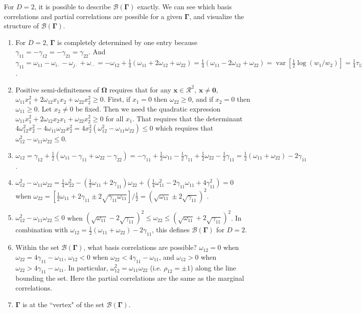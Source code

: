 \documentclass[12pt, letterpaper]{article}
\DeclareMathOperator{\var}{\text{var}}
\begin{document}
For $D = 2$, it is possible to describe $\mathscr{B}(\bm{\Gamma})$ exactly. We can see which basis correlations and partial correlations are possible for a given $\bm{\Gamma}$, and visualize the structure of $\mathscr{B}(\bm{\Gamma})$.
\begin{enumerate}
\item For $D = 2$, $\bm{\Gamma}$ is completely determined by one entry because $\gamma_{11} = -\gamma_{12} = -\gamma_{21} = \gamma_{22}$. And $\gamma_{11} = \omega_{11} - \omega_{i\cdot} - \omega_{j\cdot} + \omega_{\cdot\cdot} = -\omega_{12} + \frac{1}{4}(\omega_{11} + 2\omega_{12} + \omega_{22}) = \frac{1}{4}(\omega_{11} - 2\omega_{12} + \omega_{22}) = \var[\frac{1}{2} \log(w_1/w_2)] = \frac{1}{4} \tau_{12}$.
\item Positive semi-definiteness of $\bm{\Omega}$ requires that for any $\bm{x} \in \mathscr{R}^2,\ \bm{x} \ne \bm{0}$, $\omega_{11} x_1^2 + 2\omega_{12} x_1 x_2 + \omega_{22} x_2^2 \geq 0$. First, if $x_1 = 0$ then $\omega_{22} \geq 0$, and if $x_2 = 0$ then $\omega_{11} \geq 0$. Let $x_2 \ne 0$ be fixed. Then we need the quadratic expression $\omega_{11} x_1^2 + 2\omega_{12} x_2 x_1 + \omega_{22} x_2^2 \geq 0$ for all $x_1$. That requires that the determinant $4\omega_{12}^2 x_2^2 - 4\omega_{11}\omega_{22} x_2^2 = 4x_2^2 (\omega_{12}^2 - \omega_{11}\omega_{22}) \leq 0$ which requires that $\omega_{12}^2 - \omega_{11}\omega_{22} \leq 0$.
\item $\omega_{12} = \gamma_{12} + \frac{1}{2}(\omega_{11} - \gamma_{11} + \omega_{22} - \gamma_{22}) = -\gamma_{11} + \frac{1}{2}\omega_{11} - \frac{1}{2}\gamma_{11} + \frac{1}{2}\omega_{22} -  \frac{1}{2}\gamma_{11} = \frac{1}{2}(\omega_{11} + \omega_{22}) - 2\gamma_{11}$.
\item $\omega_{12}^2 - \omega_{11}\omega_{22} = \frac{1}{4}\omega_{22}^2 - (\frac{1}{2}\omega_{11} + 2\gamma_{11})\omega_{22} + (\frac{1}{4}\omega_{11}^2 - 2\gamma_{11}\omega_{11} + 4\gamma_{11}^2) = 0$ when $\omega_{22} = \left[ \frac{1}{2}\omega_{11} + 2\gamma_{11} \pm 2\sqrt{\gamma_{11}\omega_{11}} \right] / \frac{1}{2} = (\sqrt{\omega_{11}} \pm 2\sqrt{\gamma_{11}})^2$.
\item $\omega_{12}^2 - \omega_{11}\omega_{22} \leq 0$ when $(\sqrt{\omega_{11}} - 2\sqrt{\gamma_{11}})^2 \leq \omega_{22} \leq (\sqrt{\omega_{11}} + 2\sqrt{\gamma_{11}})^2$. In combination with $\omega_{12} = \frac{1}{2}(\omega_{11} + \omega_{22}) - 2\gamma_{11}$, this defines $\mathscr{B}(\bm{\Gamma})$ for $D = 2$.
\item Within the set $\mathscr{B}(\bm{\Gamma})$, what basis correlations are possible? $\omega_{12} = 0$ when $\omega_{22} = 4\gamma_{11} - \omega_{11}$, $\omega_{12} < 0$ when $\omega_{22} < 4\gamma_{11} - \omega_{11}$, and $\omega_{12} > 0$ when $\omega_{22} > 4\gamma_{11} - \omega_{11}$. In particular, $\omega_{12}^2 = \omega_{11}\omega_{22}$ (i.e. $\rho_{12} = \pm 1$) along the line bounding the set. Here the partial correlations are the same as the marginal correlations.
\item $\bm{\Gamma}$ is at the ``vertex" of the set $\mathscr{B}(\bm{\Gamma})$.
\end{enumerate}
\end{document}
